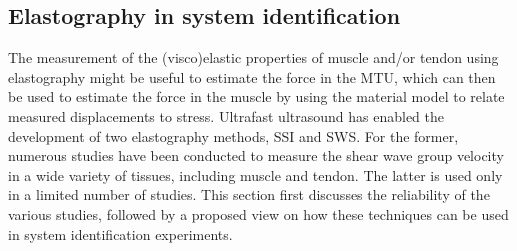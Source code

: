 \subsection{Elastography in system identification}
The measurement of the (visco)elastic properties of muscle and/or tendon using elastography might be useful to estimate the force in the MTU, which can then be used to estimate the force in the muscle by using the material model to relate measured displacements to stress. Ultrafast ultrasound has enabled the development of two elastography methods, SSI and SWS. For the former, numerous studies have been conducted to measure the shear wave group velocity in a wide variety of tissues, including muscle and tendon. The latter is used only in a limited number of studies. This section first discusses the reliability of the various studies, followed by a proposed view on how these techniques can be used in system identification experiments. 

